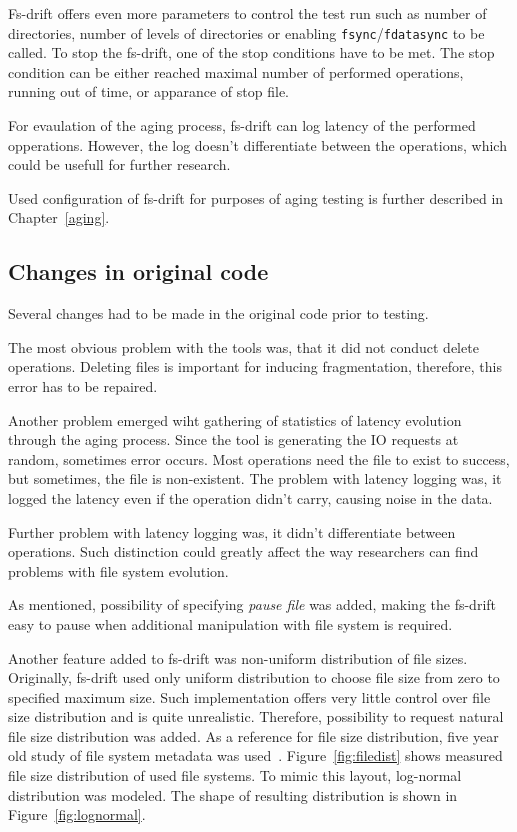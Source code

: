 \documentclass[
  color, %
  table, %
  lof,   %
  lot,   %
]{fithesis3}
\begin{document}
Fs-drift offers even more parameters to control the test run such as number of directories, number of levels of directories or enabling \texttt{fsync}/\texttt{fdatasync} to be called. To stop the fs-drift, one of the stop conditions have to be met. The stop condition can be either reached maximal number of performed operations, running out of time, or apparance of stop file.

For evaulation of the aging process, fs-drift can log latency of the performed opperations. However, the log doesn't differentiate between the operations, which could be usefull for further research.

Used configuration of fs-drift for purposes of aging testing is further described in Chapter~\ref{aging}.

\subsection{Changes in original code}
\label{text:fsdrift_changes}
Several changes had to be made in the original code prior to testing.

The most obvious problem with the tools was, that it did not conduct delete operations. Deleting files is important for inducing fragmentation, therefore, this error has to be repaired.

Another problem emerged wiht gathering  of statistics of latency evolution through the aging process. Since the tool is generating the IO requests at random, sometimes error occurs. Most operations need the file to exist to success, but sometimes, the file is non-existent. The problem with latency logging was, it logged the latency even if the operation didn't carry, causing noise in the data.

Further problem with latency logging was, it didn't differentiate between operations. Such distinction could greatly affect the way researchers can find problems with file system evolution.

As mentioned, possibility of specifying \emph{pause file} was added, making the fs-drift easy to pause when additional manipulation with file system is required.

Another feature added to fs-drift was non-uniform distribution of file sizes. Originally, fs-drift used only uniform distribution to choose file size from zero to specified maximum size. Such implementation offers very little control over file size distribution and is quite unrealistic. Therefore, possibility to request natural file size distribution was added. As a reference for file size distribution, five year old study of file system metadata was used~\cite{agrawal2007five}. Figure~\ref{fig:filedist} shows measured file size distribution of used file systems. To mimic this layout, log-normal distribution was modeled. The shape of resulting distribution is shown in Figure~\ref{fig:lognormal}.
\end{document}
